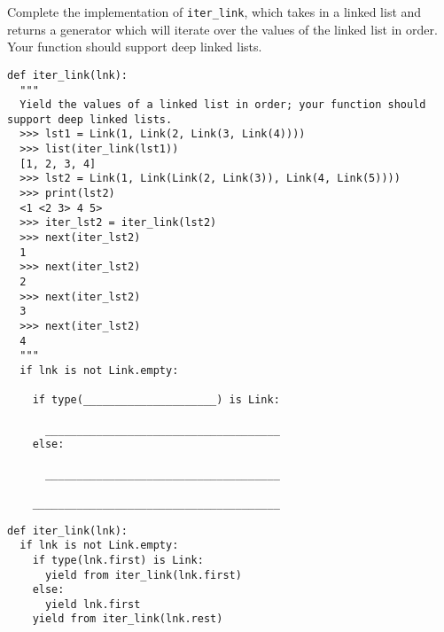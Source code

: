 \begin{blocksection}
\question Complete the implementation of \lstinline{iter_link}, which takes in a linked list and returns a generator which will iterate over the values of the linked list in order. Your function should support deep linked lists.
\vspace{1\baselineskip}
\begin{lstlisting}
def iter_link(lnk):
  """ 
  Yield the values of a linked list in order; your function should support deep linked lists.
  >>> lst1 = Link(1, Link(2, Link(3, Link(4))))
  >>> list(iter_link(lst1))
  [1, 2, 3, 4]
  >>> lst2 = Link(1, Link(Link(2, Link(3)), Link(4, Link(5))))
  >>> print(lst2)
  <1 <2 3> 4 5>
  >>> iter_lst2 = iter_link(lst2)
  >>> next(iter_lst2)
  1
  >>> next(iter_lst2)
  2
  >>> next(iter_lst2) 
  3
  >>> next(iter_lst2)
  4
  """
  if lnk is not Link.empty:

    if type(_____________________) is Link:

      _____________________________________
    else:

      _____________________________________

    _______________________________________
\end{lstlisting}
\end{blocksection}
\begin{blocksection}
\begin{solution}[0.7in]
\begin{lstlisting}
def iter_link(lnk):
  if lnk is not Link.empty:
    if type(lnk.first) is Link:
      yield from iter_link(lnk.first)
    else:
      yield lnk.first
    yield from iter_link(lnk.rest)
\end{lstlisting}
\end{solution}
\end{blocksection}